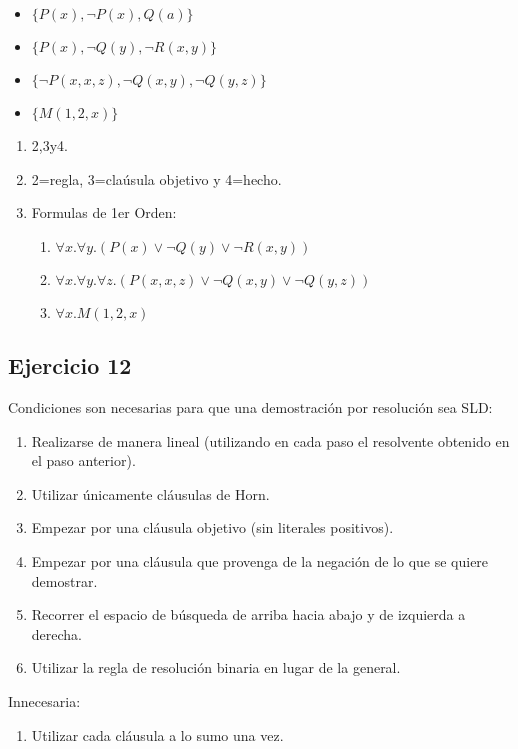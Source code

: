 \documentclass[10pt,a4paper]{article}
\begin{document}
    \begin{itemize}
        \item $\{P(x), \neg P(x), Q(a)\}$
        \item $\{P(x), \neg Q(y), \neg R(x,y) \}$
        \item $\{\neg P(x,x,z), \neg Q(x,y), \neg Q(y,z) \}$
        \item $\{M(1,2,x) \}$
    \end{itemize}
    \begin{enumerate}
        \item 2,3y4.
        \item 2=regla, 3=claúsula objetivo y 4=hecho.
        \item Formulas de 1er Orden:
            \begin{enumerate}
                \item $\forall x. \forall y. (P(x) \vee \neg Q(y) \vee \neg R(x,y))$
                \item $\forall x. \forall y. \forall z. (P(x,x,z) \vee \neg Q(x,y) \vee \neg Q(y,z))$
                \item $\forall x. M(1,2,x)$
            \end{enumerate}
    \end{enumerate}

\subsection{Ejercicio 12}
    Condiciones son necesarias para que una demostración por resolución sea SLD:
    \begin{enumerate}
        \item Realizarse de manera lineal (utilizando en cada paso el resolvente obtenido en el paso anterior).
        \item Utilizar únicamente cláusulas de Horn.
        \item Empezar por una cláusula objetivo (sin literales positivos).
        \item Empezar por una cláusula que provenga de la negación de lo que se quiere demostrar.
        \item Recorrer el espacio de búsqueda de arriba hacia abajo y de izquierda a derecha.
        \item Utilizar la regla de resolución binaria en lugar de la general.
    \end{enumerate}
    Innecesaria:
    \begin{enumerate}
        \item Utilizar cada cláusula a lo sumo una vez.
    \end{enumerate}
\end{document}
